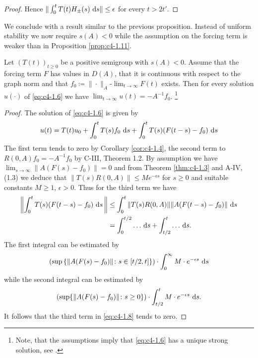 \begin{proof}
Hence $\|\int_{0}^{t} T(t)H_{\pm}(s) \, \mathop{}\!\mathrm{d}{s}\| \leq \epsilon$ for every $t > 2t'$.
\end{proof}

We conclude with a result similar to the previous proposition.
Instead of uniform stability we now require $s(A) < 0$ while the assumption on the forcing term is weaker than in Proposition \ref{prop:c4-1.11}.

\begin{proposition}\label{prop:c4-1.12}
%
%
%
Let $(T(t))_{t \geq 0}$ be a positive semigroup with $s(A) < 0$.
Assume that the forcing term $F$ has values in $D(A)$, that it is continuous with respect to the graph norm and that $f_{0} \coloneq  \|\cdot\|_{A}$-$\lim_{t \to \infty} F(t)$ exists.
Then for every solution $u(\cdot)$ of \eqref{eq:c4-1.6} we have $\lim_{t \to \infty} u(t) = -A^{-1}f_{0}$.
\footnote{Note, that the assumptions imply that \eqref{eq:c4-1.6} has a unique strong solution, see \citet[ Theorem~4.2.4]{pazy:1983}.}
\end{proposition}
\begin{proof}
The solution of \eqref{eq:c4-1.6} is given by
\begin{equation}\label{eq:c4-1.8}
u(t) = T(t)u_{0} + \int_{0}^{t} T(s)f_{0} \, \mathop{}\!\mathrm{d}{s} + \int_{0}^{t} T(s)(F(t-s)-f_{0}) \, \mathop{}\!\mathrm{d}{s}
\end{equation}
The first term tends to zero by Corollary \ref{cor:c4-1.4},  
the second term to $R(0,A)f_{0} = -A^{-1}f_{0}$ by C-III, Theorem 1.2.
By assumption we have $\lim_{s \to \infty}\|A(F(s)-f_{0})\| = 0$ and from Theorem \ref{thm:c4-1.3} and A-IV, (1.3) we deduce that $\|T(s)R(0,A)\| \leq Me^{-\epsilon s}$ for $s \geq 0$ and suitable constants $M \geq 1$, $\epsilon > 0$.
Thus for the third term we have
\begin{align*}
 \left\|\int_{0}^{t} T(s)(F(t-s)-f_{0}) \, \mathop{}\!\mathrm{d}{s}\,\right\| &\leq \int_{0}^{t} \|T(s)R(0,A)\| \|A(F(t-s)-f_{0})\| \, \mathop{}\!\mathrm{d}{s} \\
&= \int_{0}^{t/2} \ldots \, \mathop{}\!\mathrm{d}{s} + \int_{t/2}^{t} \ldots \, \mathop{}\!\mathrm{d}{s}.
\end{align*}
The first integral can be estimated by
\[
 \left(\sup  \left\{\|A(F(s)-f_{0})\| \colon s \in 
 \left[ t/2 , t \right] \right\} \right) 
\cdot \int_{0}^{\infty} M \cdot e^{-\epsilon s} \, \mathop{}\!\mathrm{d}{s}
\]
while the second integral can be estimated by 
\[
 \left(\sup\{\|A(F(s)-f_{0})\| \colon s \geq 0\}\right)
\cdot \int_{t/2}^{t} M \cdot e^{- \epsilon s} \, \mathop{}\!\mathrm{d}{s}.
\]
It follows that the third term in \eqref{eq:c4-1.8} tends to zero.
\end{proof}
\clearpage
